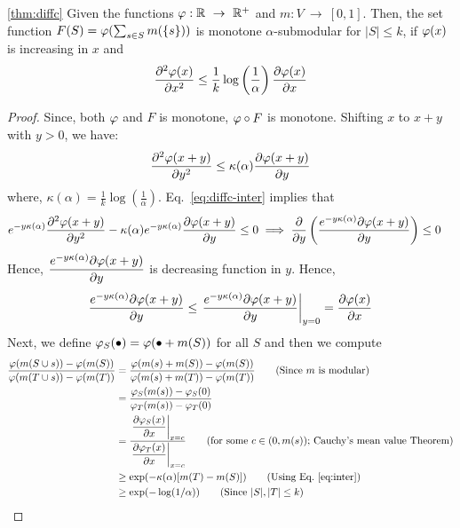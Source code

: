 \documentclass{article}
\newcommand{\ga}{\kappa(\alpha)}
\begin{document}
\begin{numtheorem}{\ref{thm:diffc}}
 Given the functions $\varphi:\mathbb{R}~\to~\mathbb{R}^+$ and $m:V~\to~[0,1]$. Then, the set function $F(S) =  \varphi(\sum_{s\in S}m(\left\{ s\right\}))$  is monotone 
 $\alpha$-submodular for  $|S|\le k$, if $\varphi(x)$ is increasing in $x$ and
 \begin{align}
 \frac{\partial ^2 \varphi(x)}{\partial x^2} \le \frac{1}{k}\log\left(\frac{1}{\alpha}\right)\frac{\partial  \varphi(x)}{\partial x} 
\end{align}
 \end{numtheorem}
\begin{proof} Since, both $\varphi$ and $F$ is monotone, $\varphi\circ F$ is monotone. Shifting $x$ to $x+y$ with $y>0$, we have:
 \begin{align}
  \frac{\p ^2 \diffc(x+y)}{\p y^2} \le \ga \frac{\p  \diffc(x+y)}{\p y}\label{eq:diffc-inter} 
\end{align}
where, $\ga = \frac{1}{k}\log\left(\frac{1}{\alpha}\right)$. Eq.~\eqref{eq:diffc-inter}
implies that
\begin{align}
&  e^{-y\ga} \frac{\p ^2 \diffc(x+y)}{\p y^2}-  \ga e^{-y\ga}\frac{\p  \diffc(x+y)}{\p y} \le 0  \implies \frac{\p}{\p y}\left( \frac{ e^{-y\ga} \p  \diffc(x+y) }  {\p y} \right) \le 0
\end{align}
Hence, $\displaystyle \frac{ e^{-y\ga} \p  \diffc(x+y) }  {\p y}$ is decreasing function in $y$. Hence, 
\begin{align}
 \frac{ e^{-y\ga} \p  \diffc(x+y) }  {\p y} \le \left. \frac{ e^{-y\ga} \p  \diffc(x+y) }  {\p y} \right| _{y=0} =  \frac{  \p  \diffc(x) }  {\p x} \label{eq:inter}
\end{align}
Next, we define $\varphi_S(\bullet) = \varphi(\bullet+m(S))$ for all $S$ and then we compute 
\begin{align}
\frac{ \diffc(m(S\cup s))- \diffc(m(S))}{ \diffc(m(T\cup s))- \diffc(m(T))}& =  \frac{ \diffc(m({s}) + m(S))- \diffc(m(S))}{ \diffc(m({s}) + m(T))- \diffc(m(T))} \qquad \text{(Since $m$ is modular)} \\
& = \frac{ \diffc_S(m({s}))- \diffc_S(0)}{ \diffc_T(m({s}))- \diffc_T(0)} \\
& =  \dfrac{\left.\dfrac{  \p  \diffc_S(x) }  {\p x} \right|_{x=c}}{\left.\dfrac{  \p  \diffc_T(x) }  {\p x}\right|_{x=c}}\qquad\text{(for some $c\in(0, m({s}))$; Cauchy's mean value Theorem)}  \nn\\
& \ge \exp(-\ga [m(T)-m(S)]) \qquad\text{(Using Eq.~\eqref{eq:inter})}\nn\\
& \ge \exp(-\log(1/\alpha)) \qquad \text{(Since $|S|, |T|\le k$)}
\end{align}
\end{proof}
\end{document}
